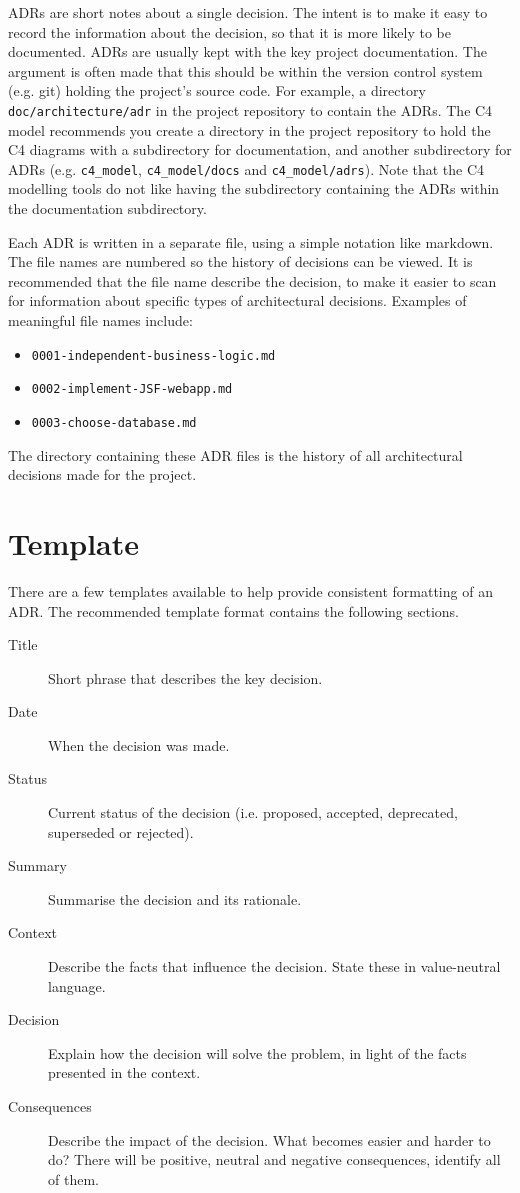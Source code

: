 ADRs are short notes about a single decision.
The intent is to make it easy to record the information about the decision, so that it is more likely to be documented.
ADRs are usually kept with the key project documentation.
The argument is often made that this should be within the version control system (e.g. git) holding the project's source code.
For example, a directory \texttt{doc/architecture/adr} in the project repository to contain the ADRs.
The C4 model recommends you create a directory in the project repository to hold the C4 diagrams
with a subdirectory for documentation, and another subdirectory for ADRs
(e.g. \texttt{c4_model}, \texttt{c4_model/docs} and \texttt{c4_model/adrs}).
Note that the C4 modelling tools do not like having the subdirectory containing the ADRs within the documentation subdirectory.

Each ADR is written in a separate file, using a simple notation like markdown.
The file names are numbered so the history of decisions can be viewed.
It is recommended that the file name describe the decision,
to make it easier to scan for information about specific types of architectural decisions.
Examples of meaningful file names include:
\begin{itemize}[noitemsep,nolistsep]
    \item \texttt{0001-independent-business-logic.md}
    \item \texttt{0002-implement-JSF-webapp.md}
    \item \texttt{0003-choose-database.md}
\end{itemize}
The directory containing these ADR files is the history of all architectural decisions made for the project.

\section{Template}
There are a few templates available to help provide consistent formatting of an ADR.
The recommended template format contains the following sections.
\begin{description}
    \item[Title] Short phrase that describes the key decision.
    \item[Date] When the decision was made.
    \item[Status] Current status of the decision (i.e. proposed, accepted, deprecated, superseded or rejected).
    \item[Summary] Summarise the decision and its rationale.
    \item[Context] Describe the facts that influence the decision. State these in value-neutral language.
    \item[Decision] Explain how the decision will solve the problem, in light of the facts presented in the context.
    \item[Consequences] Describe the impact of the decision. What becomes easier and harder to do?
                        There will be positive, neutral and negative consequences, identify all of them.
\end{description}

